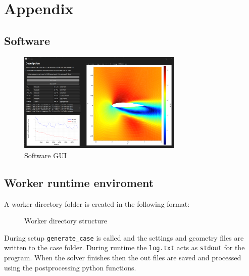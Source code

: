 \documentclass{article}
\begin{document}
\section{Appendix}

\subsection{Software}

\begin{figure}[H]
    \centering
    \includegraphics[width=0.7\textwidth]{figures/software.png}
    \caption{Software GUI}
    \label{fig:software}
\end{figure}

\subsection{Worker runtime enviroment}

A worker directory folder is created in the following format:
\begin{figure}[H]
    \caption{Worker directory structure}
    \label{fig:worker_dir}
\end{figure}

During setup \texttt{generate\_case} is called and the settings and geometry files are written to the case folder.
During runtime the \texttt{log.txt} acts as \texttt{stdout} for the program.
When the solver finishes then the out files are saved and processed using the postprocessing python functions.
\end{document}
